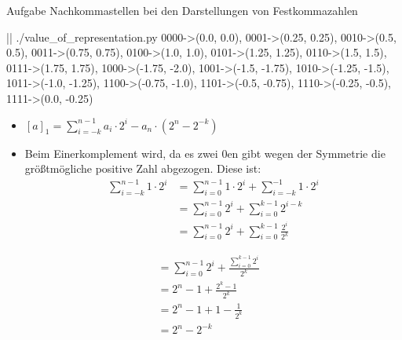\begin{frame}{Aufgabe \thesection}{Nachkommastellen bei den Darstellungen von Festkommazahlen\vspace{0.5cm}}
    \begin{requirementsnoinc}
    \end{requirementsnoinc}
    \begin{requirementsnoinc}
        \begin{terminal}
            |\prompt| ./value_of_representation.py
            {0000->(0.0, 0.0), 0001->(0.25, 0.25), 0010->(0.5, 0.5), 0011->(0.75, 0.75), 0100->(1.0, 1.0), 0101->(1.25, 1.25), 
            0110->(1.5, 1.5), 0111->(1.75, 1.75),  1000->(-1.75, -2.0), 1001->(-1.5, -1.75), 1010->(-1.25, -1.5), 
            1011->(-1.0, -1.25), 1100->(-0.75, -1.0), 1101->(-0.5, -0.75), 1110->(-0.25, -0.5), 1111->(0.0, -0.25)}        
        \end{terminal}
    \end{requirementsnoinc}

    \begin{solutionnoinc}
        \begin{itemize}
            \item $\displaystyle[a]_{1}=\sum_{i=-k}^{n-1}a_{i}\cdot2^{i}-a_{n}\cdot(2^{n}-2^{-k})$
            \item Beim \alert{Einerkomplement} wird, da es zwei $0$en gibt wegen der Symmetrie die größtmögliche positive Zahl abgezogen. Diese ist: 
            \begin{align*}
            \sum_{i=-k}^{n-1}1\cdot2^{i} &= \sum_{i=0}^{n-1}1\cdot2^{i} + \sum_{i=-k}^{-1}1\cdot2^{i} \\
            &= \sum_{i=0}^{n-1}2^{i} + \sum_{i=0}^{k-1} 2^{i-k}\\
            &= \sum_{i=0}^{n-1}2^{i} + \sum_{i=0}^{k-1} \frac{2^{i}}{2^k}
            \end{align*}
        \end{itemize}
    \end{solutionnoinc}
    \begin{solutionnoinc}
\begin{align*}
      &= \sum_{i=0}^{n-1}2^{i} +  \frac{\sum_{i=0}^{k-1} 2^{i}}{2^k} \\
      & = 2^n-1+\frac{2^k-1}{2^k}\\
      & = 2^n-1+1-\frac{1}{2^k}\\
      & = 2^n-2^{-k}
      \end{align*}
    \end{solutionnoinc}
\end{frame}

